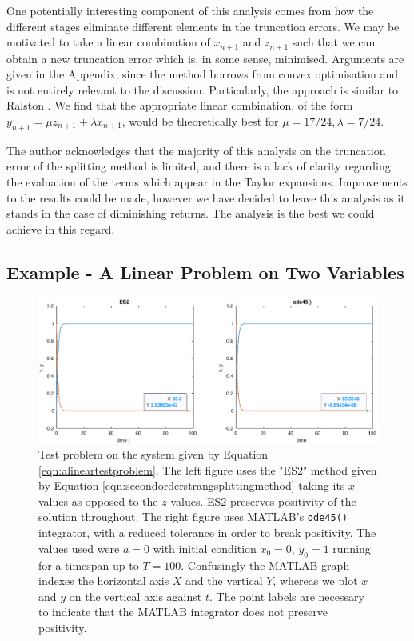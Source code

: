 One potentially interesting component of this analysis comes from how the different stages eliminate different elements in the truncation errors.
We may be motivated to take a linear combination of $x_{n+1}$ and $z_{n+1}$ such that we can obtain a new truncation error which is, in some sense, minimised.
Arguments are given in the Appendix, since the method borrows from convex optimisation \cite{boyd2004convex} and is not entirely relevant to the discussion.
Particularly, the approach is similar to Ralston \cite{ralston1962runge}.
We find that the appropriate linear combination, of the form $y_{n+1} = \mu z_{n+1} + \lambda x_{n+1}$,
would be theoretically best for $\mu = 17/24, \lambda = 7/24$.

The author acknowledges that the majority of this analysis on the truncation error of the splitting method is limited, and there is a lack of clarity regarding the evaluation of the terms which appear in the Taylor expansions.
Improvements to the results could be made, however we have decided to leave this analysis as it stands in the case of diminishing returns.
The analysis is the best we could achieve in this regard.

\subsection{Example - A Linear Problem on Two Variables}

\begin{figure}
    \centering
    \includegraphics[width = \linewidth]{Matlab/linearproblempositivity.eps}
    \caption{
        Test problem on the system given by Equation \ref{eqn:alineartestproblem}.
        The left figure uses the "ES2" method given by Equation \ref{eqn:secondorderstrangsplittingmethod} taking its $x$ values as opposed to the $z$ values.
        ES2 preserves positivity of the solution throughout.
        The right figure uses MATLAB's \texttt{ode45()} integrator, with a reduced tolerance in order to break positivity.
        The values used were $a=0$ with initial condition $x_0 = 0$, $y_0 = 1$ running for a timespan up to $T = 100$.
        Confusingly the MATLAB graph indexes the horizontal axis $X$ and the vertical $Y$, whereas we plot $x$ and $y$ on the vertical axis against $t$.
        The point labels are necessary to indicate that the MATLAB integrator does not preserve positivity.
    }
    \label{fig:breakposlin}
\end{figure}

